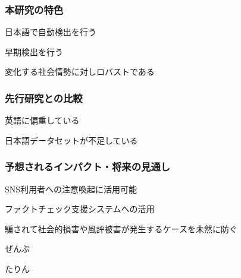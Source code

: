 \subsubsection*{本研究の特色}
日本語で自動検出を行う

早期検出を行う

変化する社会情勢に対しロバストである

\subsubsection*{先行研究との比較}
英語に偏重している

日本語データセットが不足している

\subsubsection*{予想されるインパクト・将来の見通し}
SNS利用者への注意喚起に活用可能

ファクトチェック支援システムへの活用

騙されて社会的損害や風評被害が発生するケースを未然に防ぐ


ぜんぶ

たりん

\vspace{1cm}


